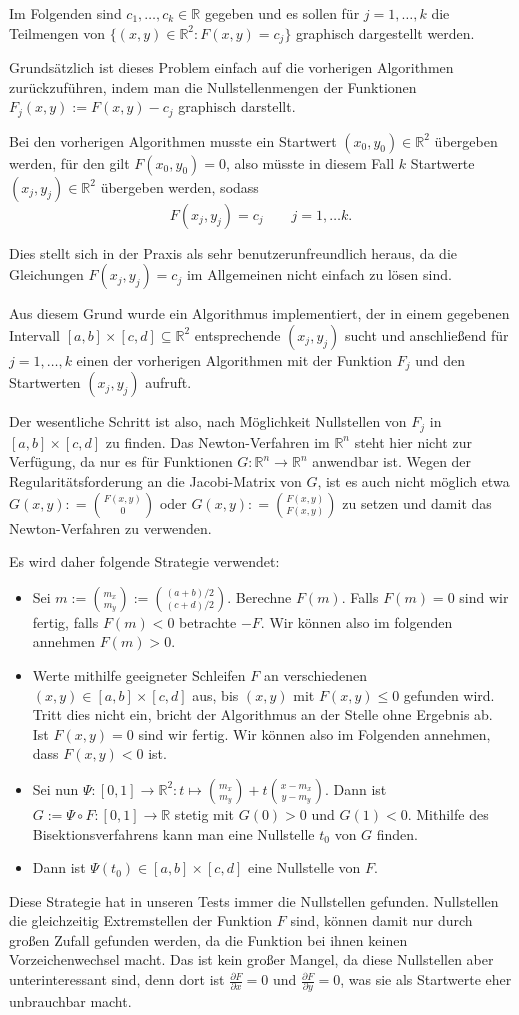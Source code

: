 \documentclass[a4paper,11pt,bibliography=totoc,listof=totoc,headinclude=true,cleardoublepage=empty,oneside]{scrartcl}
\newcommand{\R}{\mathbb{R}}
\renewcommand{\subset}{\subseteq}
\newcommand{\diff}[2]{\frac{\partial #1}{\partial #2}}
\begin{document}
Im Folgenden sind $c_1,\dots, c_k \in \R$ gegeben und es sollen für $j=1,\dots,k$ die Teilmengen von $\{ (x,y) \in \R^2 : F(x,y)=c_j \}$ graphisch dargestellt werden.

Grundsätzlich ist dieses Problem einfach auf die vorherigen Algorithmen zurückzuführen, indem man die Nullstellenmengen der Funktionen $F_j(x,y) := F(x,y) -c_j$ graphisch darstellt.

Bei den vorherigen Algorithmen musste ein Startwert $(x_0,y_0) \in \R^2$ übergeben werden, für den gilt $F(x_0,y_0)=0$, also müsste in diesem Fall $k$ Startwerte $(x_j,y_j) \in \R^2$ übergeben werden, sodass
\[
F(x_j,y_j) = c_j \qquad j=1,\dots k.
\]

Dies stellt sich in der Praxis als sehr benutzerunfreundlich heraus, da die Gleichungen $F(x_j,y_j)=c_j$ im Allgemeinen nicht einfach zu lösen sind. 

Aus diesem Grund wurde ein Algorithmus implementiert, der in einem gegebenen Intervall $[a,b]\times[c,d] \subset \R^2$ entsprechende $(x_j,y_j)$ sucht und anschließend für $j=1,\dots, k$ einen der vorherigen Algorithmen mit der Funktion $F_j$ und den Startwerten $(x_j,y_j)$ aufruft. 

Der wesentliche Schritt ist also, nach Möglichkeit Nullstellen von $F_j$ in $[a,b] \times [c,d]$ zu finden. Das Newton-Verfahren im $\R^n$ steht hier nicht zur Verfügung, da nur es für Funktionen $G: \R^n \to \R^n$ anwendbar ist. Wegen der Regularitätsforderung  an die Jacobi-Matrix von $G$, ist es auch nicht möglich etwa $G(x,y) : = \binom{F(x,y)}{0}$ oder $G(x,y) : = \binom{F(x,y)}{F(x,y)}$ zu setzen und damit das Newton-Verfahren zu verwenden.

Es wird daher folgende Strategie verwendet:
\begin{itemize}
	\item Sei $m:= \binom{m_x}{m_y} := \binom{(a+b)/2}{(c+d)/2}$. Berechne $F(m)$. Falls $F(m)=0$ sind wir fertig, falls $F(m)<0$ betrachte $-F$. Wir können also im folgenden annehmen $F(m)>0$.
	\item Werte mithilfe geeigneter Schleifen $F$ an verschiedenen $(x,y) \in [a,b]\times [c,d]$ aus, bis $(x,y)$ mit $F(x,y)\le 0$ gefunden wird. Tritt dies nicht ein, bricht der Algorithmus an der Stelle ohne Ergebnis ab. Ist $F(x,y)=0$ sind wir fertig. Wir können also im Folgenden annehmen, dass $F(x,y)<0$ ist.
	\item Sei nun $\Psi : [0,1] \to \R^2 : t \mapsto \binom{m_x}{m_y} + t \binom{x-m_x}{y-m_y}$. Dann ist $ G:= \Psi \circ F : [0,1] \to \R$ stetig mit $G(0)>0$ und $G(1)<0$. Mithilfe des Bisektionsverfahrens kann man eine Nullstelle $t_0$ von $G$ finden.
	\item Dann ist $\Psi(t_0) \in [a,b] \times [c,d]$ eine Nullstelle von $F$.
\end{itemize} 
Diese Strategie hat in unseren Tests immer die Nullstellen gefunden. Nullstellen die gleichzeitig Extremstellen der Funktion $F$ sind, können damit nur durch großen Zufall gefunden werden, da die Funktion bei ihnen keinen Vorzeichenwechsel macht. Das ist kein großer Mangel, da diese Nullstellen aber unterinteressant sind, denn dort ist $\diff{F}{x}=0$ und $\diff{F}{y}=0$, was sie als Startwerte eher unbrauchbar macht.
\end{document}
